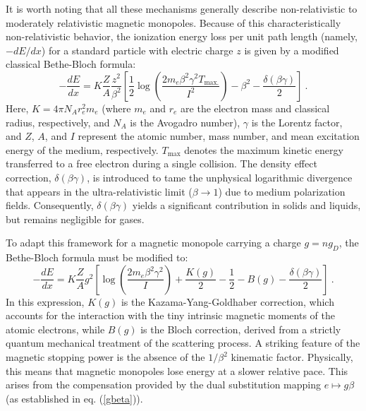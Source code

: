 \documentclass[a4paper,11pt]{article}
\begin{document}
It is worth noting that all these mechanisms generally describe non-relativistic to moderately relativistic magnetic monopoles. Because of this characteristically non-relativistic behavior, the ionization energy loss per unit path length (namely, $-dE/dx$) for a standard particle with electric charge $z$ is given by a modified classical Bethe-Bloch formula:
 \begin{equation}\label{bethebloch}
    -\frac{dE}{dx}=K\frac{Z}{A}\frac{z^2}{\beta^2}\left[\frac{1}{2}\log\left(\frac{2m_e \beta^2\gamma^2 T_{\text{max.}}}{I^2} \right)-\beta^2-\frac{\delta(\beta \gamma)}{2} \right]\ .
 \end{equation} 
Here, $K = 4\pi N_A r_e^2 m_e$ (where $m_e$ and $r_e$ are the electron mass and classical radius, respectively, and $N_A$ is the Avogadro number), $\gamma$ is the Lorentz factor, and $Z$, $A$, and $I$ represent the atomic number, mass number, and mean excitation energy of the medium, respectively. $T_{\text{max}}$ denotes the maximum kinetic energy transferred to a free electron during a single collision. The density effect correction, $\delta(\beta\gamma)$, is introduced to tame the unphysical logarithmic divergence that appears in the ultra-relativistic limit ($\beta \rightarrow 1$) due to medium polarization fields. Consequently, $\delta(\beta\gamma)$ yields a significant contribution in solids and liquids, but remains negligible for gases.

To adapt this framework for a magnetic monopole carrying a charge $g = n g_D$, the Bethe-Bloch formula must be modified to:
\begin{equation}\label{betheblochmm}
    -\frac{dE}{dx}=K\frac{Z}{A}g^2\left[\log\left(\frac{2m_e\beta^2\gamma^2}{I} \right)+\frac{K(g)}{2}-\frac{1}{2}-B(g)-\frac{\delta(\beta\gamma)}{2} \right]\ .
\end{equation}
In this expression, $K(g)$ is the Kazama-Yang-Goldhaber correction, which accounts for the interaction with the tiny intrinsic magnetic moments of the atomic electrons, while $B(g)$ is the Bloch correction, derived from a strictly quantum mechanical treatment of the scattering process. A striking feature of the magnetic stopping power is the absence of the $1/\beta^2$ kinematic factor. Physically, this means that magnetic monopoles lose energy at a slower relative pace. This arises from the compensation provided by the dual substitution mapping $e \mapsto g\beta$ (as established in eq. (\ref{gbeta})).
\end{document}
